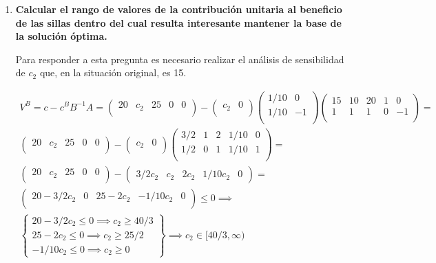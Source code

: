 \begin{enumerate}
\item \textbf{Calcular el rango de valores de la contribución unitaria al beneficio de las sillas dentro del cual resulta interesante mantener la base de la solución óptima.}

Para responder a esta pregunta es necesario realizar el análisis de sensibilidad de $c_2$ que, en la situación original, es 15.

\begin{equation}
\begin{split}
V^B = c-c^BB^{-1}A = \begin{pmatrix}
20 & c_2 & 25 & 0 & 0\\
\end{pmatrix}
 - \begin{pmatrix}
c_2 & 0\\
\end{pmatrix}
\begin{pmatrix}
1/10 & 0\\
1/10 & -1\\
\end{pmatrix}
\begin{pmatrix}
15 & 10 & 20 & 1 & 0\\
1 & 1 & 1 & 0 & -1\\
\end{pmatrix}
 = \\
 \begin{pmatrix}
20 & c_2 & 25 & 0 & 0\\
\end{pmatrix}
 - \begin{pmatrix}
c_2 & 0\\
\end{pmatrix}
\begin{pmatrix}
3/2 & 1 & 2 & 1/10 & 0\\
1/2 & 0 & 1 & 1/10 & 1\\
\end{pmatrix}=\\
 \begin{pmatrix}
20 & c_2 & 25 & 0 & 0\\
\end{pmatrix}-
\begin{pmatrix}
3/2c_2 & c_2 & 2c_2 & 1/10c_2 & 0
\end{pmatrix}=\\
 \begin{pmatrix}
20-3/2c_2 & 0 & 25-2c_2 & -1/10c_2 & 0\\
\end{pmatrix}\leq 0 \implies \\
\left\{
\begin{matrix}
20-3/2c_2 \leq 0 \implies c_2 \geq 40/3 \\
25-2c_2 \leq 0 \implies c_2 \geq 25/2\\
-1/10c_2 \leq 0  \implies c_2 \geq 0 
\end{matrix}
\right\} \implies c_2 \in [40/3, \infty)
\end{split}
\end{equation}


\end{enumerate}
